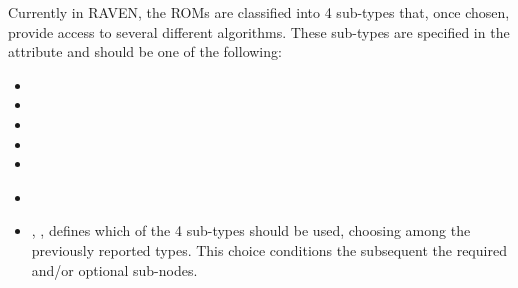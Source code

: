 Currently in RAVEN, the ROMs are classified into 4 sub-types that, once chosen,
provide access to several different algorithms.
%
These sub-types are specified in the  attribute and should be
one of the following:
\begin{itemize}
  \item {}
  \item {}
  \item {}
  \item {}
  \item {}
\end{itemize}

%
\attrsIntro
%
\vspace{-5mm}
\begin{itemize}
  \itemsep0em
  \item \nameDescription
  \item {}, , defines which of
  the 4 sub-types should be used, choosing among the previously reported
  types.
  This choice conditions the subsequent the required and/or optional 
   sub-nodes.
\end{itemize}
\vspace{-5mm}


